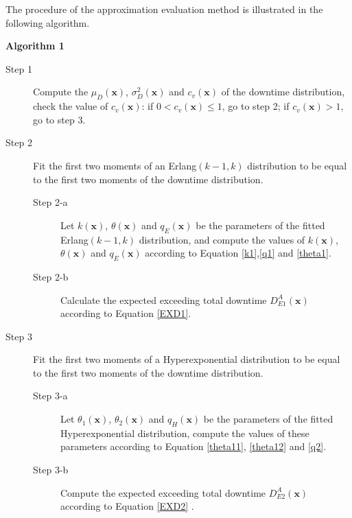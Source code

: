 \documentclass[preprint,12pt]{elsarticle}
\begin{document}
The procedure of the approximation evaluation method is illustrated in the following algorithm.

\textbf{Algorithm 1}
\label{Algorithm1}
\begin{description}
\item[Step 1] Compute the $\mu_{D}(\boldsymbol{x})$, $\sigma^{2}_{D}(\boldsymbol{x})$ and $c_{v}(\boldsymbol{x})$ of the downtime distribution, check the value of $c_{v}(\boldsymbol{x})$: if $0<c_{v}(\boldsymbol{x}) \leq 1$, go to step 2; if $c_{v}(\boldsymbol{x}) > 1$, go to step 3.
\item[Step 2] Fit the first two moments of an Erlang$(k-1, k)$ distribution to be equal to the first two moments of the downtime distribution.
 \begin{description}
 \item[Step 2-a] Let $k(\boldsymbol{x})$, $\theta(\boldsymbol{x})$ and $q_{E}(\boldsymbol{x})$ be the parameters of the fitted Erlang$(k-1,k)$ distribution, and compute the values of $k(\boldsymbol{x})$, $\theta(\boldsymbol{x})$ and $q_{E}(\boldsymbol{x})$ according to Equation \eqref{k1},\eqref{q1} and \eqref{theta1}.
 \item[Step 2-b] Calculate the expected exceeding total downtime $D_{E1}^A(\boldsymbol{x})$ according to Equation \eqref{EXD1}.
\end{description}
\item[Step 3] Fit the first two moments of a Hyperexponential distribution to be equal to the first two moments of the downtime distribution.

\begin{description}
 \item[Step 3-a] Let $\theta_{1}(\boldsymbol{x})$, $\theta_{2}(\boldsymbol{x})$ and $q_{H}(\boldsymbol{x})$ be the parameters of the fitted Hyperexponential distribution, compute the values of these parameters according to Equation \eqref{theta11}, \eqref{theta12} and \eqref{q2}.
 \item[Step 3-b] Compute the expected exceeding total downtime $D_{E2}^A(\boldsymbol{x})$ according to Equation \eqref{EXD2} .
\end{description}

\end{description}
\end{document}
